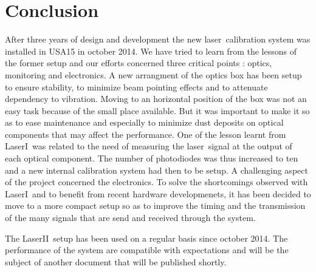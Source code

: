 \documentclass[UKenglish,texlive=2013]{\ATLASLATEXPATH atlasdoc}
\newcommand{\laser}{laser}
\newcommand{\lasi}{{\sc LaserI}}
\newcommand{\lasii}{{\sc LaserII}}
\begin{document}
\section{Conclusion}
\label{sec:conclusion}

After three years of design and development the new \laser~calibration system was installed in USA15 in october 2014. We have tried to learn from the lessons of the former setup and our efforts concerned three critical points : optics, monitoring and electronics. A new arrangment of the optics box has been setup to ensure stability, to minimize beam pointing effects and to attenuate dependency to vibration. Moving to an horizontal position of the box was not an easy task because of the small place available. But it was important to make it so as to ease maintenance and especially to minimize dust deposits on optical components that may affect the performance. 
One of the lesson learnt from \lasi~was related to the need of measuring the \laser~signal at the output of each optical component. The number of photodiodes was thus increased to ten and a new internal calibration system had then to be setup. A challenging aspect of the project concerned the electronics. To solve the shortcomings observed with \lasi~and to benefit from recent hardware developmenets, it has been decided to move to a more compact setup so as to improve the timing and the transmission of the many signals that are send and received through the system.

The \lasii~setup has been used on a regular basis since october 2014. The performance of the system are compatible with expectations and will be the subject of another document that will be published shortly.

\begin{comment}
\section*{Acknowledgements}

%

The \texttt{atlaslatex} package contains the acknowledgements that were valid 
at the time of the release you are using.
These can be found in the \texttt{acknowledgements} subdirectory.
When your ATLAS paper or PUB/CONF note is ready to be published,
download the latest set of acknowledgements from:\\
\url{https://twiki.cern.ch/twiki/bin/view/AtlasProtected/PubComAcknowledgements}

The supporting notes for the analysis should also contain a list of contributors.
This information should usually be included in \texttt{mydocument-metadata.tex}.
The list should be printed either here or before the table of contents.
\end{comment}
\end{document}
